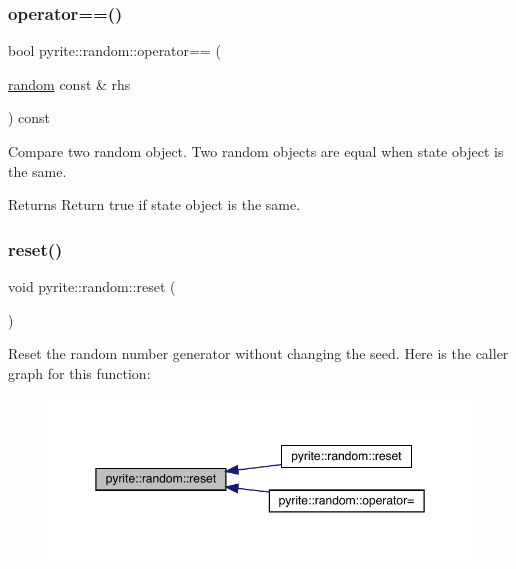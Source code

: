 \subsubsection{\texorpdfstring{operator==()}{operator==()}}
{\footnotesize\ttfamily bool pyrite\+::random\+::operator== (\begin{DoxyParamCaption}\item[{\mbox{\hyperlink{classpyrite_1_1random}{random}} const \&}]{rhs }\end{DoxyParamCaption}) const\hspace{0.3cm}{\ttfamily [noexcept]}}

Compare two random object. Two random objects are equal when state object is the same.

\begin{DoxyReturn}{Returns}
Return true if state object is the same. 
\end{DoxyReturn}
\mbox{\label{classpyrite_1_1random_aed264da4ddd55aab1cf72ddb091ec902}} 
\subsubsection{\texorpdfstring{reset()}{reset()}\hspace{0.1cm}{\footnotesize\ttfamily [1/3]}}
{\footnotesize\ttfamily void pyrite\+::random\+::reset (\begin{DoxyParamCaption}{ }\end{DoxyParamCaption})}

Reset the random number generator without changing the seed. Here is the caller graph for this function\+:
\nopagebreak
\begin{figure}[H]
\begin{center}
\leavevmode
\includegraphics[width=350pt]{d2/df9/classpyrite_1_1random_aed264da4ddd55aab1cf72ddb091ec902_icgraph}
\end{center}
\end{figure}
\mbox{\label{classpyrite_1_1random_a6d5947d6c425031e81f8488187a332f3}} 
